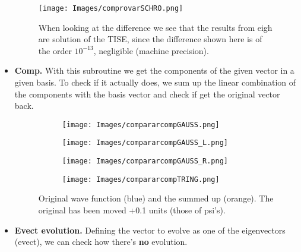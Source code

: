 \documentclass{article}
\begin{document}
\begin{itemize}
\begin{figure}[H]
	\centering
	\texttt{[image: Images/comprovarSCHRO.png]}
	\captionsetup{justification = centering, 
		width = 0.9\textwidth}
	\caption{When looking at the difference we see that the results from eigh are solution of the TISE, since the difference shown here is of the order $10^{-13}$, negligible (machine precision).}
	\label{fig:checkTISE}
\end{figure}

\item \textbf{Comp.} With this subroutine we get the components of the given vector in a given basis. To check if it actually does, we sum up the linear combination of the components with the basis vector and check if get the original vector back.


\begin{figure}[H]
	\centering
	\begin{subfigure}{.4\textwidth}
		\centering
		\texttt{[image: Images/compararcompGAUSS.png]}
	\end{subfigure}
	\begin{subfigure}{.4\textwidth}
		\centering
		\texttt{[image: Images/compararcompGAUSS\_L.png]}
	\end{subfigure}
	\begin{subfigure}{.4\textwidth}
		\centering
		\texttt{[image: Images/compararcompGAUSS\_R.png]}
	\end{subfigure}
	\begin{subfigure}{.4\textwidth}
		\centering
		\texttt{[image: Images/compararcompTRING.png]}
\end{subfigure}
	\captionsetup{justification = centering, width = \textwidth}
	\caption{Original wave function (blue) and the summed up (orange). The original has been moved +0.1 units (those of psi's).}
	\label{fig:comp}
\end{figure}

\item \textbf{Evect evolution.} Defining  the vector to evolve as one of the eigenvectors (evect), we can check how there's \textbf{no} evolution.


\end{itemize}
\end{document}
